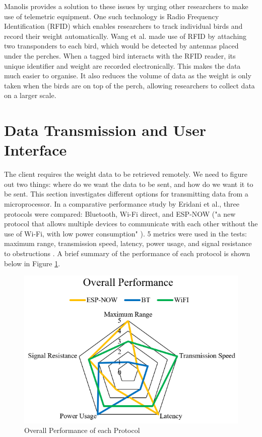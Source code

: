 \documentclass[class=report,11pt,crop=false]{standalone}
\begin{document}
Manolis \cite{manoils2024simple} provides a solution to these issues by urging other researchers to make use of telemetric equipment. One such technology is Radio Frequency Identification (RFID) which enables researchers to track individual birds and record their weight automatically. Wang et al. \cite{wang2019rfid} made use of RFID by attaching two transponders to each bird, which would be detected by antennas placed under the perches. When a tagged bird interacts with the RFID reader, its unique identifier and weight are recorded electronically. This makes the data much easier to organise. It also reduces the volume of data as the weight is only taken when the birds are on top of the perch, allowing researchers to collect data on a larger scale. 

\pagebreak
\section{Data Transmission and User Interface}
The client requires the weight data to be retrieved remotely. We need to figure out two things: where do we want the data to be sent, and how do we want it to be sent.
This section investigates different options for transmitting data from a microprocessor. In a comparative performance study by Eridani et al., three protocols were compared: Bluetooth, Wi-Fi direct, and ESP-NOW ("a new protocol that allows multiple devices to communicate with each other without the use of Wi-Fi, with low power consumption" \cite{comparitiveEspnow}). 5 metrics were used in the tests: maximum range, transmission speed, latency, power usage, and signal resistance to obstructions \cite{comparitiveEspnow}. A brief summary of the performance of each protocol is shown below in Figure \ref{fig:performance}.
\begin{figure}[h]
	\centering
	\includegraphics[width=0.7\linewidth]{Figures/performance}
	\caption{Overall Performance of each Protocol \cite{comparitiveEspnow}}
	\label{fig:performance}
\end{figure}
\end{document}
